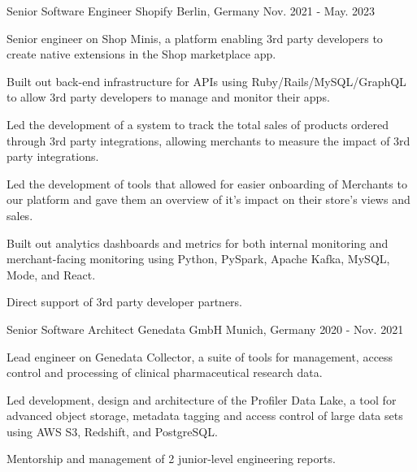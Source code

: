 \begin{cventries}
  \cventry
  {Senior Software Engineer} %
  {Shopify} %
  {Berlin, Germany} %
  {Nov. 2021 - May. 2023} %
  {
    \begin{cvitems} %
      \item {Senior engineer on Shop Minis, a platform enabling 3rd party developers to create native extensions in the Shop marketplace app.}
      \item {Built out back-end infrastructure for APIs using Ruby/Rails/MySQL/GraphQL to allow 3rd party developers to manage and monitor their apps.}
      \item {Led the development of a system to track the total sales of products ordered through 3rd party integrations, allowing merchants to measure the impact of 3rd party integrations.}
      \item {Led the development of tools that allowed for easier onboarding of Merchants to our platform and gave them an overview of it’s impact on their store’s views and sales.}
      \item {Built out analytics dashboards and metrics for both internal monitoring and merchant-facing monitoring using Python, PySpark, Apache Kafka, MySQL, Mode, and React.}
      \item {Direct support of 3rd party developer partners.}
    \end{cvitems}
  }

  \cventry
  {Senior Software Architect} %
  {Genedata GmbH} %
  {Munich, Germany} %
  {2020 - Nov. 2021} %
  {
    \begin{cvitems} %
      \item {Lead engineer on Genedata Collector, a suite of tools for management, access control and processing of clinical pharmaceutical research data.}
      \item {Led development, design and architecture of the Profiler Data Lake, a tool for advanced object storage, metadata tagging and access control of large data sets using AWS S3, Redshift, and PostgreSQL.}
      \item {Mentorship and management of 2 junior-level engineering reports.}
    \end{cvitems}
  }


\end{cventries}
